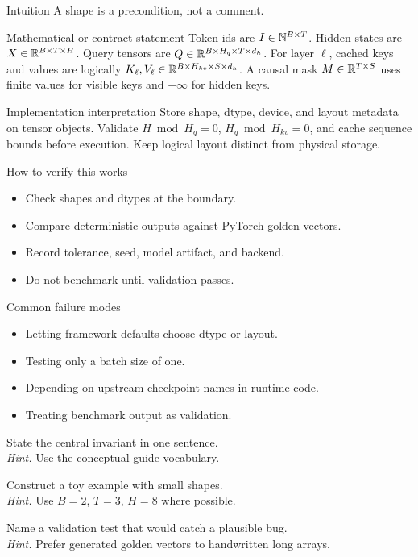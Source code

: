 \begin{intuitionbox}{Intuition}
A shape is a precondition, not a comment.
\end{intuitionbox}

\begin{definitionbox}{Mathematical or contract statement}
Token ids are \(I\in\mathbb{N}^{B\times T}\). Hidden states are \(X\in\mathbb{R}^{B\times T\times H}\). Query tensors are \(Q\in\mathbb{R}^{B\times H_q\times T\times d_h}\). For layer \(\ell\), cached keys and values are logically \(K_\ell,V_\ell\in\mathbb{R}^{B\times H_{kv}\times S\times d_h}\). A causal mask \(M\in\mathbb{R}^{T\times S}\) uses finite values for visible keys and \(-\infty\) for hidden keys.
\end{definitionbox}

\begin{implementationbox}{Implementation interpretation}
Store shape, dtype, device, and layout metadata on tensor objects. Validate \(H \bmod H_q=0\), \(H_q \bmod H_{kv}=0\), and cache sequence bounds before execution. Keep logical layout distinct from physical storage.
\end{implementationbox}

\begin{verificationbox}{How to verify this works}
\begin{itemize}
\item Check shapes and dtypes at the boundary.
\item Compare deterministic outputs against PyTorch golden vectors.
\item Record tolerance, seed, model artifact, and backend.
\item Do not benchmark until validation passes.
\end{itemize}
\end{verificationbox}

\begin{warningbox}{Common failure modes}
\begin{itemize}
\item Letting framework defaults choose dtype or layout.
\item Testing only a batch size of one.
\item Depending on upstream checkpoint names in runtime code.
\item Treating benchmark output as validation.
\end{itemize}
\end{warningbox}

\begin{chapterexercises}
\item State the central invariant in one sentence.\\
\textit{Hint.} Use the conceptual guide vocabulary.
\item Construct a toy example with small shapes.\\
\textit{Hint.} Use $B=2$, $T=3$, $H=8$ where possible.
\item Name a validation test that would catch a plausible bug.\\
\textit{Hint.} Prefer generated golden vectors to handwritten long arrays.
\end{chapterexercises}

